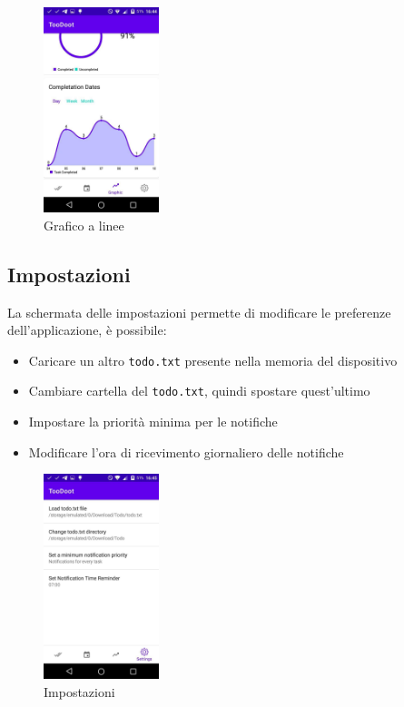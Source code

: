 \documentclass[]{article}
\providecommand{\tightlist}{%
  \setlength{\itemsep}{0pt}\setlength{\parskip}{0pt}}
\begin{document}
\begin{figure}
\centering
\includegraphics[width=0.3\textwidth,height=0.1\textheight]{./img/grafico_linee.jpg}
\caption{Grafico a linee}
\end{figure}

\hypertarget{impostazioni}{%
\subsection{Impostazioni}\label{impostazioni}}

La schermata delle impostazioni permette di modificare le preferenze
dell'applicazione, è possibile:

\begin{itemize}
\tightlist
\item
  Caricare un altro \texttt{todo.txt} presente nella memoria del
  dispositivo
\item
  Cambiare cartella del \texttt{todo.txt}, quindi spostare quest'ultimo
\item
  Impostare la priorità minima per le notifiche
\item
  Modificare l'ora di ricevimento giornaliero delle notifiche
\end{itemize}

\begin{figure}
\centering
\includegraphics[width=0.3\textwidth,height=0.1\textheight]{./img/impostazioni.jpg}
\caption{Impostazioni}
\end{figure}
\end{document}
